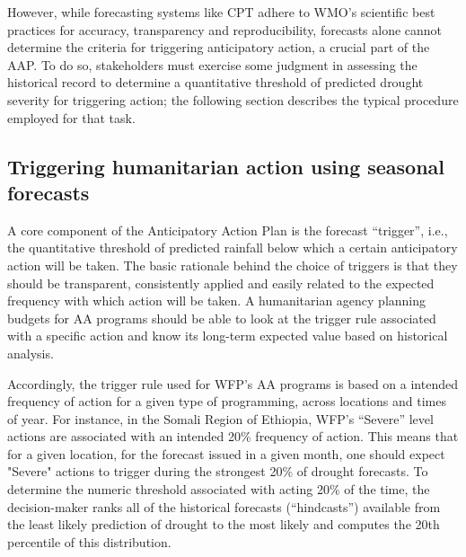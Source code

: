 \documentclass{ametsocV6.1}
\begin{document}
However, while forecasting systems like CPT adhere to WMO's scientific best practices for accuracy, transparency and reproducibility, forecasts alone cannot determine the criteria for triggering anticipatory action, a crucial part of the AAP. To do so, stakeholders must exercise some judgment in assessing the historical record to determine a quantitative threshold of predicted drought severity for triggering action; the following section describes the typical procedure employed for that task.

\subsection{Triggering humanitarian action using seasonal forecasts}

A core component of the Anticipatory Action Plan is the forecast “trigger”, i.e., the quantitative threshold of predicted rainfall below which a certain anticipatory action will be taken. The basic rationale behind the choice of triggers is that they should be transparent, consistently applied and easily related to the expected frequency with which action will be taken. A humanitarian agency planning budgets for AA programs should be able to look at the trigger rule associated with a specific action and know its long-term expected value based on historical analysis. 

Accordingly, the trigger rule used for WFP's AA programs is based on a intended frequency of action for a given type of programming, across locations and times of year. For instance, in the Somali Region of Ethiopia, WFP's “Severe” level actions are associated with an intended 20\% frequency of action. This means that for a given location, for the forecast issued in a given month, one should expect "Severe" actions to trigger during the strongest 20\% of drought forecasts. To determine the numeric threshold associated with acting 20\% of the time, the decision-maker ranks all of the historical forecasts (“hindcasts”) available from the least likely prediction of drought to the most likely and computes the 20th percentile of this distribution.
\end{document}
